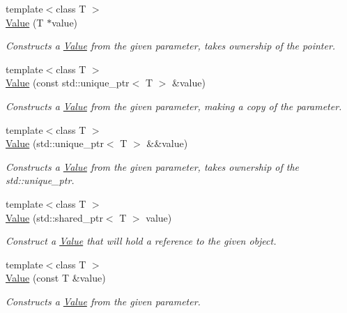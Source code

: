 \begin{DoxyCompactItemize}
{\footnotesize template$<$class T $>$ }\\\hyperlink{classdg_1_1deepcore_1_1_value_a1a06f9b7c5b04325bcb3954f0eeabf29}{Value} (T $\ast$value)
\begin{DoxyCompactList}\small\item\em Constructs a \hyperlink{classdg_1_1deepcore_1_1_value}{Value} from the given parameter, takes ownership of the pointer. \end{DoxyCompactList}\item 
{\footnotesize template$<$class T $>$ }\\\hyperlink{classdg_1_1deepcore_1_1_value_abd848e73761701ebea6429e0e8e3cf11}{Value} (const std\+::unique\+\_\+ptr$<$ T $>$ \&value)
\begin{DoxyCompactList}\small\item\em Constructs a \hyperlink{classdg_1_1deepcore_1_1_value}{Value} from the given parameter, making a copy of the parameter. \end{DoxyCompactList}\item 
{\footnotesize template$<$class T $>$ }\\\hyperlink{classdg_1_1deepcore_1_1_value_a54b7de7d86c566e6523dc97794363af4}{Value} (std\+::unique\+\_\+ptr$<$ T $>$ \&\&value)
\begin{DoxyCompactList}\small\item\em Constructs a \hyperlink{classdg_1_1deepcore_1_1_value}{Value} from the given parameter, takes ownership of the {\ttfamily std\+::unique\+\_\+ptr}. \end{DoxyCompactList}\item 
{\footnotesize template$<$class T $>$ }\\\hyperlink{classdg_1_1deepcore_1_1_value_a27964a285668d18b7e24dca64cde9446}{Value} (std\+::shared\+\_\+ptr$<$ T $>$ value)
\begin{DoxyCompactList}\small\item\em Construct a \hyperlink{classdg_1_1deepcore_1_1_value}{Value} that will hold a reference to the given object. \end{DoxyCompactList}\item 
{\footnotesize template$<$class T $>$ }\\\hyperlink{classdg_1_1deepcore_1_1_value_a98e95afa16652d7f44e18326f118d024}{Value} (const T \&value)
\begin{DoxyCompactList}\small\item\em Constructs a \hyperlink{classdg_1_1deepcore_1_1_value}{Value} from the given parameter. \end{DoxyCompactList}\item 

\end{DoxyCompactItemize}
